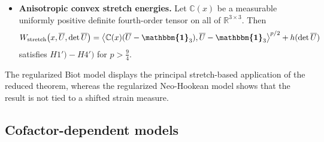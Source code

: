 \documentclass[11pt]{article}
\newcommand{\id}{{\boldsymbol{\mathbbm{1}}}}
\begin{document}
\begin{itemize}
The purely quadratic choice $p=2$ corresponds to the classical first-invariant
part, but it does not satisfy $H4')$, which requires $p>\frac{9}{4}$. Therefore, if one
wants to keep the classical quadratic term, one should use the regularized form
\begin{align}
        W_{\rm stretch}\bigl(x,\overline U,\det \overline U\bigr)
        =
        \mu  | \overline U | ^2
        +
        \varepsilon  | \overline U | ^p
        +
        h(\det \overline U),
        \qquad
        \mu\geq0,
        \qquad
        \varepsilon>0,
        \qquad
        p>\frac{9}{4}.
\end{align}

\item \textbf{Anisotropic convex stretch energies.}
Let $\mathbb C(x)$ be a measurable uniformly positive definite fourth-order
tensor on all of $\mathbb{R}^{3\times 3}$. Then
\begin{align}
        W_{\rm stretch}\bigl(x,\overline U,\det \overline U\bigr)
        =
        \left\langle
        \mathbb C(x)(\overline U-\id_3),\overline U-\id_3
        \right\rangle^{p/2}
        +
        h(\det \overline U)
\end{align}
satisfies $H1')-H4')$ for
$
        p>\frac{9}{4}.
$


\end{itemize}

The regularized Biot model displays the principal stretch-based application of the reduced theorem, whereas the regularized Neo-Hookean model shows that the result is not tied to a shifted strain measure.

\subsection{Cofactor-dependent models}
\end{document}
